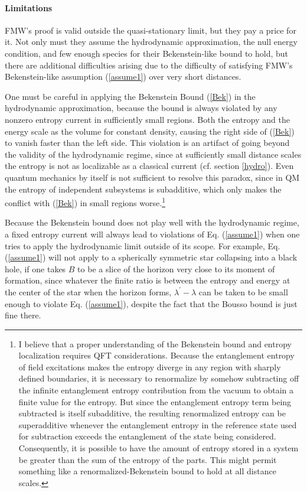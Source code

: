 \documentclass[12pt]{article}
\begin{document}
\paragraph{Limitations}

FMW's proof is valid outside the quasi-stationary limit, but they pay a price for it.  Not only must they assume the hydrodynamic approximation, the null energy condition, and few enough species for their Bekenstein-like bound to hold, but there are additional difficulties arising due to the difficulty of satisfying FMW's Bekenstein-like assumption (\ref{assume1}) over very short distances.

One must be careful in applying the Bekenstein Bound (\ref{Bek}) in the hydrodynamic approximation, because the bound is always violated by any nonzero entropy current in sufficiently small regions.  Both the entropy and the energy scale as the volume for constant density, causing the right side of (\ref{Bek}) to vanish faster than the left side.  This violation is an artifact of going beyond the validity of the hydrodynamic regime, since at sufficiently small distance scales the entropy is not as localizable as a classical current (cf. section \ref{hydro}).  Even quantum mechanics by itself is not sufficient to resolve this paradox, since in QM the entropy of independent subsystems is subadditive, which only makes the conflict with (\ref{Bek}) in small regions worse.\footnote{I believe that a proper understanding of the Bekenstein bound and entropy localization requires QFT considerations.  Because the entanglement entropy of field excitations makes the entropy diverge in any region with sharply defined boundaries, it is necessary to renormalize by somehow subtracting off the infinite entanglement entropy contribution from the vacuum to obtain a finite value for the entropy.  But since the entanglement entropy term being subtracted is itself subadditive, the resulting renormalized entropy can be superadditive whenever the entanglement entropy in the reference state used for subtraction exceeds the entanglement of the state being considered.  Consequently, it is possible to have the amount of entropy stored in a system be greater than the sum of the entropy of the parts.  This might permit something like a renormalized-Bekenstein bound to hold at all distance scales.}

Because the Bekenstein bound does not play well with the hydrodynamic regime, a fixed entropy current will always lead to violations of Eq. (\ref{assume1}) when one tries to apply the hydrodynamic limit outside of its scope.  For example, Eq. (\ref{assume1}) will not apply to a spherically symmetric star collapsing into a black hole, if one takes $B$ to be a slice of the horizon very close to its moment of formation, since whatever the finite ratio is between the entropy and energy at the center of the star when the horizon forms, $\lambda^{\prime} - \lambda$ can be taken to be small enough to violate Eq. (\ref{assume1}), despite the fact that the Bousso bound is just fine there.
\end{document}
